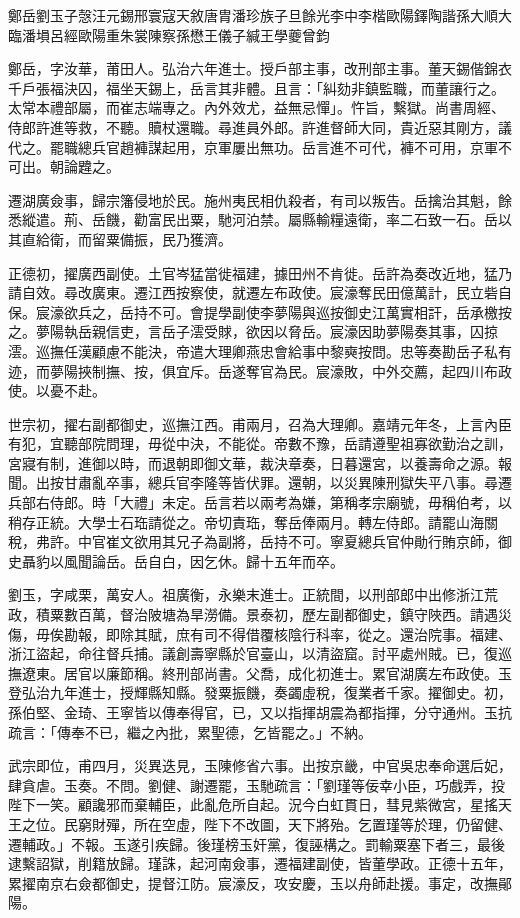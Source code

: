 
\begin{pinyinscope}
鄭岳劉玉子愨汪元錫邢寰寇天敘唐胄潘珍族子旦餘光李中李楷歐陽鐸陶諧孫大順大臨潘塤呂經歐陽重朱裳陳察孫懋王儀子緘王學夔曾鈞

鄭岳，字汝華，莆田人。弘治六年進士。授戶部主事，改刑部主事。董天錫偕錦衣千戶張福決囚，福坐天錫上，岳言其非體。且言：「糾劾非鎮監職，而董讓行之。太常本禮部屬，而崔志端專之。內外效尤，益無忌憚」。忤旨，繫獄。尚書周經、侍郎許進等救，不聽。贖杖還職。尋進員外郎。許進督師大同，貴近惡其剛方，議代之。罷職總兵官趙褲謀起用，京軍屢出無功。岳言進不可代，褲不可用，京軍不可出。朝論韙之。

遷湖廣僉事，歸宗籓侵地於民。施州夷民相仇殺者，有司以叛告。岳擒治其魁，餘悉縱遣。荊、岳饑，勸富民出粟，馳河泊禁。屬縣輸糧遠衛，率二石致一石。岳以其直給衛，而留粟備振，民乃獲濟。

正德初，擢廣西副使。土官岑猛當徙福建，據田州不肯徙。岳許為奏改近地，猛乃請自效。尋改廣東。遷江西按察使，就遷左布政使。宸濠奪民田億萬計，民立砦自保。宸濠欲兵之，岳持不可。會提學副使李夢陽與巡按御史江萬實相訐，岳承檄按之。夢陽執岳親信吏，言岳子澐受賕，欲因以脅岳。宸濠因助夢陽奏其事，囚掠澐。巡撫任漢顧慮不能決，帝遣大理卿燕忠會給事中黎奭按問。忠等奏勘岳子私有迹，而夢陽挾制撫、按，俱宜斥。岳遂奪官為民。宸濠敗，中外交薦，起四川布政使。以憂不赴。

世宗初，擢右副都御史，巡撫江西。甫兩月，召為大理卿。嘉靖元年冬，上言內臣有犯，宜聽部院問理，毋從中決，不能從。帝數不豫，岳請遵聖祖寡欲勤治之訓，宮寢有制，進御以時，而退朝即御文華，裁決章奏，日暮還宮，以養壽命之源。報聞。出按甘肅亂卒事，總兵官李隆等皆伏罪。還朝，以災異陳刑獄失平八事。尋遷兵部右侍郎。時「大禮」未定。岳言若以兩考為嫌，第稱孝宗廟號，毋稱伯考，以稍存正統。大學士石珤請從之。帝切責珤，奪岳俸兩月。轉左侍郎。請罷山海關稅，弗許。中官崔文欲用其兄子為副將，岳持不可。寧夏總兵官仲勛行賄京師，御史聶豹以風聞論岳。岳自白，因乞休。歸十五年而卒。

劉玉，字咸栗，萬安人。祖廣衡，永樂末進士。正統間，以刑部郎中出修浙江荒政，積粟數百萬，督治陂塘為旱澇備。景泰初，歷左副都御史，鎮守陜西。請遇災傷，毋俟勘報，即除其賦，庶有司不得借覆核陰行科率，從之。還治院事。福建、浙江盜起，命往督兵捕。議創壽寧縣於官臺山，以清盜窟。討平處州賊。已，復巡撫遼東。居官以廉節稱。終刑部尚書。父喬，成化初進士。累官湖廣左布政使。玉登弘治九年進士，授輝縣知縣。發粟振饑，奏蠲虛稅，復業者千家。擢御史。初，孫伯堅、金琦、王寧皆以傳奉得官，已，又以指揮胡震為都指揮，分守通州。玉抗疏言：「傳奉不已，繼之內批，累聖德，乞皆罷之。」不納。

武宗即位，甫四月，災異迭見，玉陳修省六事。出按京畿，中官吳忠奉命選后妃，肆貪虐。玉奏。不問。劉健、謝遷罷，玉馳疏言：「劉瑾等佞幸小臣，巧戲弄，投陛下一笑。顧讒邪而棄輔臣，此亂危所自起。況今白虹貫日，彗見紫微宮，星搖天王之位。民窮財殫，所在空虛，陛下不改圖，天下將殆。乞置瑾等於理，仍留健、遷輔政。」不報。玉遂引疾歸。後瑾榜玉奸黨，復誣構之。罰輸粟塞下者三，最後逮繫詔獄，削籍放歸。瑾誅，起河南僉事，遷福建副使，皆董學政。正德十五年，累擢南京右僉都御史，提督江防。宸濠反，攻安慶，玉以舟師赴援。事定，改撫鄖陽。


\end{pinyinscope}
